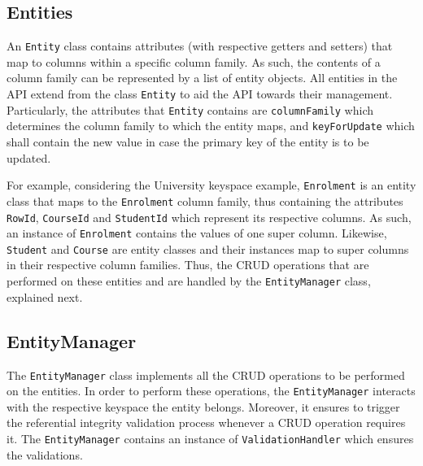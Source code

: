 	\subsection{Entities} 
	
	An \texttt{Entity} class contains attributes (with respective getters and
	setters) that map to columns within a specific column family.  As such,  the contents of a
	column family can be represented by a list of entity objects.  All entities in
	the \ac{API} extend from the class \texttt{Entity}  to
	aid the \ac{API} towards their management.  Particularly,  the attributes
	that \texttt{Entity} contains  are \texttt{columnFamily} which
	determines the column family to which the entity maps,  and 
	\texttt{keyForUpdate} which shall contain the new value in case the primary key
	of the entity is to be updated. 
	
	For example,   considering the University keyspace example,  \texttt{Enrolment} 
	is an entity class that  maps to the \texttt{Enrolment}  column family,  thus
	containing the attributes \texttt{RowId},  \texttt{CourseId} and
	\texttt{StudentId} which represent its respective columns.  As such,  an
	instance of \texttt{Enrolment} contains the values of one super column.  Likewise, 
	\texttt{Student} and \texttt{Course} are entity classes and their instances 
	map to   super columns in their respective column families. 
	Thus, the \ac{CRUD} operations that are performed on these entities  and are
	handled by the \texttt{EntityManager} class, explained next. 
		 
	\subsection{EntityManager} \label{ss:Implementation-API-EntityManager}

	The  \texttt{EntityManager} class implements  all
	the \ac{CRUD} operations to be performed on the entities.  In order to perform
	these operations,   the \texttt{EntityManager} interacts with the respective
	keyspace the entity belongs.  Moreover,  it ensures to trigger the   referential
	integrity validation process whenever a \ac{CRUD} operation requires it. The
	\texttt{EntityManager} contains an instance of \texttt{ValidationHandler} which
	ensures the validations.
	
